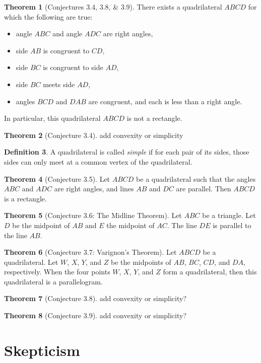 \documentclass{tufte-handout}
\theoremstyle{definition}
\newtheorem{theorem}{Theorem}[section]
\newtheorem{definition}[theorem]{Definition}
\begin{document}
\begin{theorem}[Conjectures 3.4, 3.8, \& 3.9]
There exists a quadrilateral $ABCD$ for which the following are true:
\begin{itemize}
\item angle $ABC$ and angle $ADC$ are right angles,
\item side $AB$ is congruent to $CD$,
\item side $BC$ is congruent to side $AD$,
\item side $BC$ meets side $AD$,
\item angles $BCD$ and $DAB$ are congruent, and each is less than a right angle.
\end{itemize}
In particular, this quadrilateral $ABCD$ is not a rectangle.
\end{theorem}

\begin{theorem}[Conjecture 3.4]
add convexity or simplicity
\end{theorem}


\begin{definition}
A quadrilateral is called \emph{simple} if for each pair of its sides, those sides can only meet at a common vertex of the quadrilateral.
\end{definition}

\begin{theorem}[Conjecture 3.5]
Let $ABCD$ be a quadrilateral such that the angles $ABC$ and $ADC$ are right angles, and lines $AB$ and $DC$ are parallel. Then $ABCD$ is a rectangle.
\end{theorem}

\begin{theorem}[Conjecture 3.6: The Midline Theorem]
Let $ABC$ be a triangle. Let $D$ be the midpoint of $AB$ and $E$ the midpoint of $AC$. The line $DE$ is parallel to the line $AB$.
\end{theorem}

\begin{theorem}[Conjecture 3.7: Varignon's Theorem]
Let $ABCD$ be a quadrilateral. Let $W$, $X$, $Y$, and $Z$ be the midpoints of $AB$, $BC$, $CD$, and $DA$, respectively. When the four points $W$, $X$, $Y$, and $Z$ form a quadrilateral, then this quadrilateral is a parallelogram.
\end{theorem}

\begin{theorem}[Conjecture 3.8]
add convexity or simplicity?
\end{theorem}


\begin{theorem}[Conjecture 3.9]
add convexity or simplicity?
\end{theorem}


\clearpage
\setcounter{section}{4}
\setcounter{theorem}{0}
\section{Skepticism}\label{section:skepticism}
\end{document}
